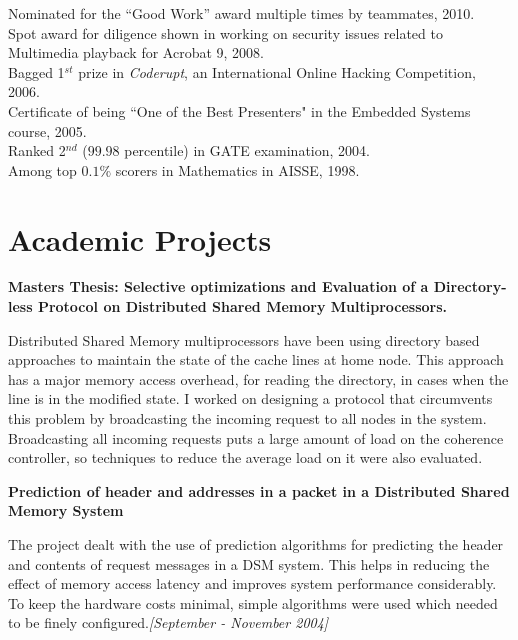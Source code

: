 \documentclass[margin,line]{resume}
\begin{document}
\begin{resume}
	Nominated for the ``Good Work'' award multiple times by teammates, 2010.  \vspace{1mm}\\%
	Spot award for diligence shown in working on security issues related to Multimedia playback for Acrobat 9, 2008.  \vspace{1mm}\\%
	Bagged 1$^{st}$ prize in \textit{Coderupt}, an International Online Hacking Competition, 2006.            \vspace{1mm}\\%
	Certificate of being ``One of the Best Presenters" in the Embedded Systems course, 2005.                  \vspace{1mm}\\%
	Ranked 2$^{nd}$ ($99.98$ percentile) in GATE examination, 2004.                                           \vspace{1mm}\\%
	Among top $0.1\%$ scorers in Mathematics in AISSE, 1998.

	\section{\mysidestyle Academic Projects}

	\textbf{Masters Thesis: Selective optimizations and Evaluation of a Directory-less Protocol on Distributed Shared Memory Multiprocessors.}

	Distributed Shared Memory multiprocessors have been using directory based approaches to maintain the state of the cache lines at home node. This approach has a major memory access overhead, for reading the directory, in cases when the line is in the modified state. I worked on designing a protocol that circumvents this problem by broadcasting the incoming request to all nodes in the system. Broadcasting all incoming requests puts a large amount of load on the coherence controller, so techniques to reduce the average load on it were also evaluated.

	\textbf{Prediction of header and addresses in a packet in a Distributed Shared Memory System}

	The project dealt with the use of prediction algorithms for predicting the header and contents of request messages in a DSM system. This helps in reducing the effect of memory access latency and improves system performance considerably. To keep the hardware costs minimal, simple algorithms were used which needed to be finely configured.\hfill \emph{[September - November 2004]}


\end{resume}
\end{document}

